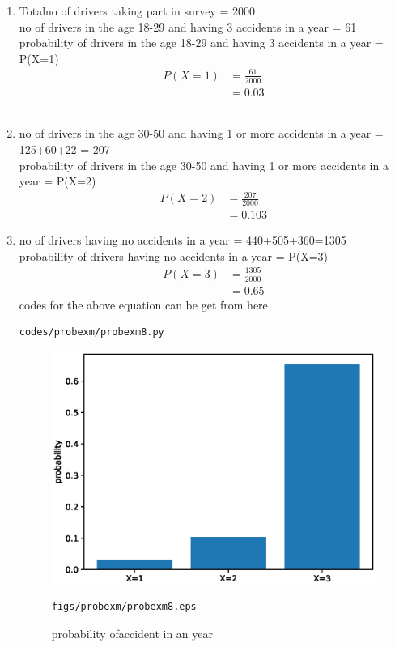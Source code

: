 \renewcommand{\theequation}{\theenumi}
\begin{enumerate}[label=\arabic*.,ref=\thesubsection.\theenumi]
\item Totalno of drivers taking part in survey = 2000
\\
no of drivers in the age 18-29 and having 3 accidents in a year = 61
\\
probability  of drivers in the age 18-29 and having 3 accidents in a year = P(X=1)\\
\begin{align}
P\left(X=1\right) &= \frac{61}{2000}
\\
&= 0.03
\end{align}
\\
\item no of drivers in the age 30-50 and having 1 or more accidents in a year = 125+60+22 = 207
\\
probability  of drivers in the age 30-50 and having 1 or more accidents in a year = P(X=2)\\
\begin{align}
P\left(X=2\right) &= \frac{207}{2000}
\\
&= 0.103
\end{align}
\item no of drivers having no accidents in a year = 440+505+360=1305
\\
probability  of drivers having no accidents in a year = P(X=3)\\
\begin{align}
P\left(X=3\right) &= \frac{1305}{2000}
\\
&= 0.65
\end{align}
codes for the above equation can be get from here
\begin{lstlisting}
codes/probexm/probexm8.py
\end{lstlisting}
\begin{figure}[!ht]
\centering
\includegraphics[width=\columnwidth]{./figures/probexm/probexm8.eps}
\caption{probability ofaccident in an year }
\label{fig:bt2}
\begin{lstlisting}
figs/probexm/probexm8.eps
\end{lstlisting}
\end{figure}
\end{enumerate}